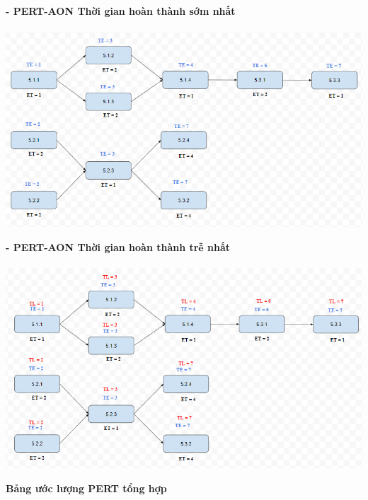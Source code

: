 \documentclass[12pt]{article}
\begin{document}
\newpage

\hspace{1cm}\textbf{- PERT-AON Thời gian hoàn thành sớm nhất \\\\} 
\vspace*{0.5cm}    
\hspace{0.7cm}\includegraphics[width=14.5cm]{PERT5_1.png}
\vspace{0.5cm}  

\hspace{1cm}\textbf{- PERT-AON Thời gian hoàn thành trễ nhất \\\\} 
\vspace*{0.5cm}    
\hspace{0.7cm}\includegraphics[width=14.5cm]{PERT5_2.png}
\vspace{0.5cm} 

\begin{center}
    \textbf{Bảng ước lượng PERT tổng hợp}
\end{center} 
\end{document}
